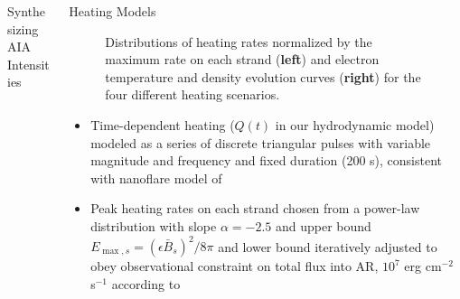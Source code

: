 \documentclass[final]{beamer}
\begin{document}
\begin{frame}
\begin{columns}[T]
\begin{column}{0.49\linewidth}
\begin{block}{Synthesizing AIA Intensities}
\begin{figure}
            \label{fig:synthesized_aia_maps}
            \centering
        \end{figure}
    \end{block}
  \end{column}
  \begin{column}{0.49\linewidth}
    \begin{block}{Heating Models}
        \begin{figure}
            \caption{Distributions of heating rates normalized by the maximum rate on each strand (\textbf{left}) and electron temperature and density evolution curves (\textbf{right}) for the four different heating scenarios.}
            \label{fig:wait_time_and_hydro}             
        \end{figure}
        \begin{itemize}
            \item Time-dependent heating ($Q(t)$ in our hydrodynamic model) modeled as a series of discrete triangular pulses with variable magnitude and frequency and fixed duration (200 s), consistent with nanoflare model of \citet{parker_nanoflares_1988}
            \item Peak heating rates on each strand chosen from a power-law distribution with slope $\alpha=-2.5$ and upper bound $E_{\max,s}=(\epsilon \bar{B}_s)^2/8\pi$ and lower bound iteratively adjusted to obey observational constraint on total flux into AR, $10^7$ erg cm$^{-2}$ s$^{-1}$ according to \citet{withbroe_mass_1977}

\end{itemize}
\end{block}
\end{column}
\end{columns}
\end{frame}
\end{document}
